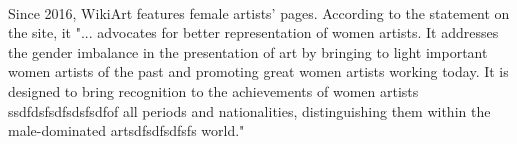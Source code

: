 \documentclass[../main]{subfiles}
\begin{document}
\paragraph{}
Since 2016, WikiArt features female artists' pages. According to the statement on the site, it "... advocates for better representation of women artists. It addresses the gender imbalance in the presentation of art by bringing to light important women artists of the past and promoting great women artists working today. It is designed to bring recognition to the achievements of women artists ssdfdsfsdfsdsfsdfof all periods and nationalities, distinguishing them within the male-dominated artsdfsdfsdfsfs world." \cite{dirac}
\end{document}
